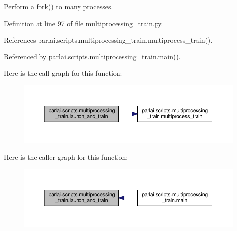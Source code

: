 \begin{DoxyVerb}Perform a fork() to many processes.\end{DoxyVerb}
 

Definition at line 97 of file multiprocessing\+\_\+train.\+py.



References parlai.\+scripts.\+multiprocessing\+\_\+train.\+multiprocess\+\_\+train().



Referenced by parlai.\+scripts.\+multiprocessing\+\_\+train.\+main().

Here is the call graph for this function\+:
\nopagebreak
\begin{figure}[H]
\begin{center}
\leavevmode
\includegraphics[width=350pt]{namespaceparlai_1_1scripts_1_1multiprocessing__train_a5dc8df166f1c025b54f7420a1ab2f812_cgraph}
\end{center}
\end{figure}
Here is the caller graph for this function\+:
\nopagebreak
\begin{figure}[H]
\begin{center}
\leavevmode
\includegraphics[width=350pt]{namespaceparlai_1_1scripts_1_1multiprocessing__train_a5dc8df166f1c025b54f7420a1ab2f812_icgraph}
\end{center}
\end{figure}
\mbox{\label{namespaceparlai_1_1scripts_1_1multiprocessing__train_aa7b2a133561ac5212f3ee9814a645522}} 
